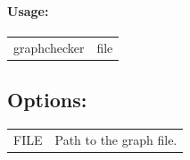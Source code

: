\documentclass[11pt]{article}
\begin{document}
\paragraph*{Usage:\\} 
\begin{tabular}{ll}
graphchecker & file
\end{tabular}
\subsection*{Options:\\} 
\begin{tabularx}{\textwidth}{lX}
  FILE                       & Path to the graph file. \\
\end{tabularx}

\vfill
\pagebreak
\vfill
\pagebreak

\end{document}

